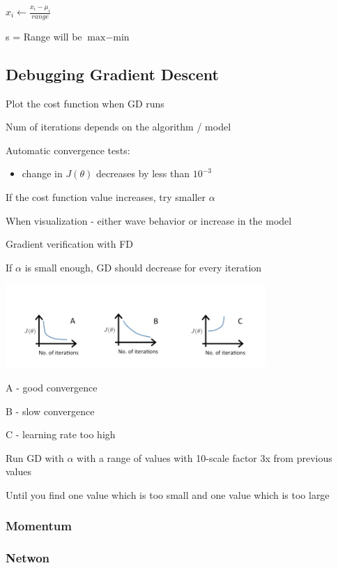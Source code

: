 $x_i \leftarrow \frac{x_i-\mu_i}{range}$

s = Range will be $\text{max}-\text{min}$

\subsection{Debugging Gradient Descent}

Plot the cost function when GD runs

Num of iterations depends on the algorithm / model

Automatic convergence tests:

\begin{itemize}
\item change in $J(\theta)$ decreases by less than $10^{-3}$
\end{itemize}

If the cost function value increases, try smaller $\alpha$

When visualization - either wave behavior or increase in the model

Gradient verification with FD

If $\alpha$ is small enough, GD should decrease for every iteration

\includegraphics[width=0.9\columnwidth]{ml_figures/convergence.png}

A - good convergence

B - slow convergence

C - learning rate too high

Run GD with $\alpha$ with a range of values with 10-scale factor  3x from previous values

Until you find one value which is too small and one value which is too large

\subsubsection{Momentum}

\subsubsection{Netwon}

